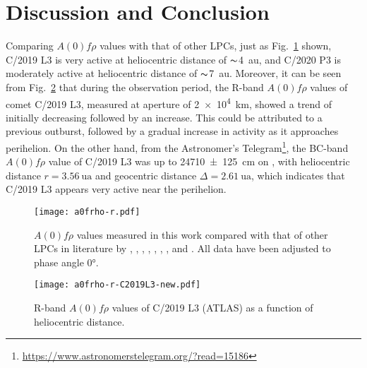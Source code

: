 \section{Discussion and Conclusion}\label{sec:dis}

Comparing $A(0)f\rho$ values with that of other LPCs, just as Fig.~\ref{fig:afrho-ref} shown, C/2019 L3 is very active at heliocentric distance of $\thicksim${\qty{4}{\astronomicalunit}}, and C/2020 P3 is moderately active at heliocentric distance of $\thicksim${\qty{7}{\astronomicalunit}}. 
Moreover, it can be seen from Fig.~\ref{fig:a0frho-c2019} that during the observation period, the R-band $A(0)f\rho$ values of comet C/2019 L3, measured at aperture of \qty{2e4}{\km}, showed a trend of initially decreasing followed by an increase. This could be attributed to a previous outburst, followed by a gradual increase in activity as it approaches perihelion. 
On the other hand, from the Astronomer's Telegram\footnote{\url{https://www.astronomerstelegram.org/?read=15186}}, the BC-band $A(0)f\rho$ value of C/2019 L3 was up to \qty{24710 +- 125}{\cm} on , with heliocentric distance $r = \qty{3.56}{\astronomicalunit}$ and geocentric distance $\Delta = \qty{2.61}{\astronomicalunit}$, which indicates that C/2019 L3 appears very active near the perihelion. 

\begin{figure}
    \centering
    \texttt{[image: a0frho-r.pdf]}
    \caption{$A(0)f\rho$ values measured in this work compared with that of other LPCs in  literature by \citet{mazzotta_epifani_observational_2014}, \citet{garcia_photometry_2021}, \citet{garcia_observational_2020}, \citet{rousselot_monitoring_2014}, \citet{meech_activity_2009}, \citet{sarneczky_activity_2016}, \citet{solontoi_ensemble_2012}, and \citet{szabo_spectrophotometry_2002}. All data have been adjusted to phase angle \ang{0}. }\label{fig:afrho-ref}
\end{figure}

\begin{figure}
    \centering
    \texttt{[image: a0frho-r-C2019L3-new.pdf]}
    \caption{R-band $A(0)f\rho$ values of C/2019 L3 (ATLAS) as a function of heliocentric distance. }\label{fig:a0frho-c2019}
\end{figure}

